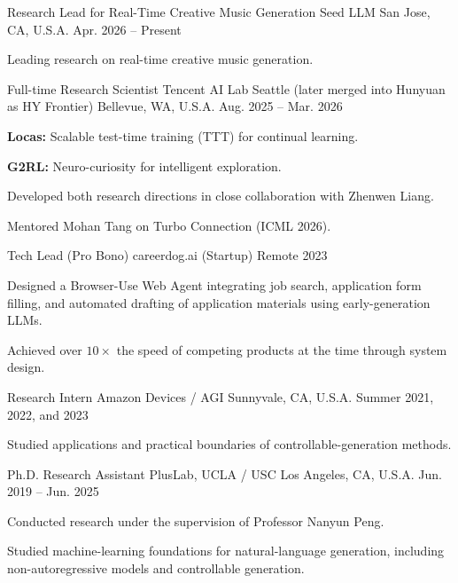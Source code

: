 
\begin{cventries}
  \cventry
    {Research Lead for Real-Time Creative Music Generation}
    {Seed LLM}
    {San Jose, CA, U.S.A.}
    {Apr. 2026 -- Present}
    {
      \begin{cvitems}
        \item {Leading research on real-time creative music generation.}
      \end{cvitems}
    }

  \cventry
    {Full-time Research Scientist}
    {Tencent AI Lab Seattle (later merged into Hunyuan as HY Frontier)}
    {Bellevue, WA, U.S.A.}
    {Aug. 2025 -- Mar. 2026}
    {
      \begin{cvitems}
        \item {\textbf{Locas:} Scalable test-time training (TTT) for continual learning.}
        \item {\textbf{G2RL:} Neuro-curiosity for intelligent exploration.}
        \item {Developed both research directions in close collaboration with Zhenwen Liang.}
        \item {Mentored Mohan Tang on Turbo Connection (ICML 2026).}
      \end{cvitems}
    }

  \cventry
    {Tech Lead (Pro Bono)}
    {careerdog.ai (Startup)}
    {Remote}
    {2023}
    {
      \begin{cvitems}
        \item {Designed a Browser-Use Web Agent integrating job search, application form filling, and automated drafting of application materials using early-generation LLMs.}
        \item {Achieved over $10\times$ the speed of competing products at the time through system design.}
      \end{cvitems}
    }

  \cventry
    {Research Intern}
    {Amazon Devices / AGI}
    {Sunnyvale, CA, U.S.A.}
    {Summer 2021, 2022, and 2023}
    {
      \begin{cvitems}
        \item {Studied applications and practical boundaries of controllable-generation methods.}
      \end{cvitems}
    }

  \cventry
    {Ph.D. Research Assistant}
    {PlusLab, UCLA / USC}
    {Los Angeles, CA, U.S.A.}
    {Jun. 2019 -- Jun. 2025}
    {
      \begin{cvitems}
        \item {Conducted research under the supervision of Professor Nanyun Peng.}
        \item {Studied machine-learning foundations for natural-language generation, including non-autoregressive models and controllable generation.}
      \end{cvitems}
    }


\end{cventries}
